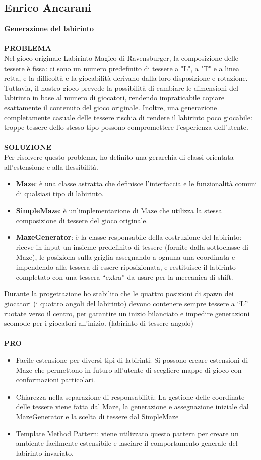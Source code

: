 \documentclass[a4paper,12pt]{report}
\begin{document}
\subsection{Enrico Ancarani}
\textbf{Generazione del labirinto}
\\
\\
\textbf{PROBLEMA}\\
Nel gioco originale Labirinto Magico di Ravensburger, la composizione delle tessere è fissa: ci sono un numero predefinito di tessere a "L", a "T" e a linea retta, 
e la difficoltà e la giocabilità derivano dalla loro disposizione e rotazione. Tuttavia, il nostro gioco prevede la possibilità di cambiare le dimensioni del labirinto 
in base al numero di giocatori, rendendo impraticabile copiare esattamente il contenuto del gioco originale.
Inoltre, una generazione completamente casuale delle tessere rischia di rendere il labirinto poco giocabile: troppe tessere dello stesso tipo 
possono compromettere l’esperienza dell’utente.\\
\\
\textbf{SOLUZIONE}\\
Per risolvere questo problema, ho definito una gerarchia di classi orientata all’estensione e alla flessibilità.
\begin{itemize}
	\item \textbf{Maze}: è una classe astratta che definisce l’interfaccia e le funzionalità comuni di qualsiasi tipo di labirinto.
	\item \textbf{SimpleMaze}: è un’implementazione di Maze che utilizza la stessa composizione di tessere del gioco originale.
	\item \textbf{MazeGenerator}: è la classe responsabile della costruzione del labirinto: riceve in input un insieme predefinito di tessere 
	(fornite dalla sottoclasse di Maze), le posiziona sulla griglia assegnando a ognuna una coordinata e impendendo alla tessera di 
	essere riposizionata, e restituisce il labirinto completato con una tessera “extra” da usare per la meccanica di shift.
\end{itemize}
Durante la progettazione ho stabilito che le quattro posizioni di spawn dei giocatori (i quattro angoli del labirinto) 
devono contenere sempre tessere a “L” ruotate verso il centro, per garantire un inizio bilanciato e impedire generazioni scomode per i giocatori all'inizio. (labirinto di tessere angolo)
\\
\\
\textbf{PRO}
\begin{itemize}
	\item Facile estensione per diversi tipi di labirinti: Si possono creare estensioni di Maze che permettono in futuro all'utente di scegliere mappe di gioco con conformazioni 
	particolari.
	\item Chiarezza nella separazione di responsabilità: La gestione delle coordinate delle tessere viene fatta dal Maze, la generazione e assegnazione iniziale dal MazeGenerator e 
	la scelta di tessere dal SimpleMaze
	\item Template Method Pattern: viene utilizzato questo pattern per creare un ambiente facilmente estensibile e lasciare il comportamento generale del labirinto invariato.
\end{itemize}
\end{document}
